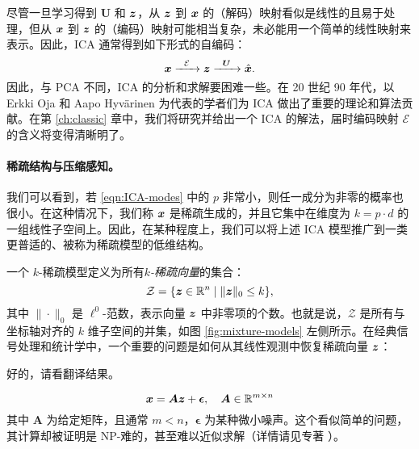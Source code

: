 \documentclass[../../book-main.tex]{subfiles}
\begin{document}
尽管一旦学习得到 $\boldsymbol{U}$ 和 $\bm{z}$，从 $\bm{z}$ 到 $\bm{x}$ 的（解码）映射看似是线性的且易于处理，但从 $\bm{x}$ 到 $\bm{z}$ 的（编码）映射可能相当复杂，未必能用一个简单的线性映射来表示。因此，ICA 通常得到如下形式的自编码：
\begin{equation}
    \bm{x}   \xrightarrow{\hspace{2mm} \mathcal{E}\hspace{2mm}} \bm{z}  \xrightarrow{\hspace{2mm} \boldsymbol{U} \hspace{2mm}} \hat {\bm{x}}.
       \label{eqn:auto-encoding-ICA}
\end{equation}
因此，与 PCA 不同，ICA 的分析和求解要困难一些。在 20 世纪 90 年代，以 Erkki Oja 和 Aapo Hyv\"{a}rinen \cite{hyvarinen-1997,Hyvrinen-2000} 为代表的学者们为 ICA 做出了重要的理论和算法贡献。在第 \ref{ch:classic} 章中，我们将研究并给出一个 ICA 的解法，届时编码映射 $\mathcal{E}$ 的含义将变得清晰明了。



\paragraph{稀疏结构与压缩感知。}
我们可以看到，若 \eqref{eqn:ICA-modes} 中的 $p$ 非常小，则任一成分为非零的概率也很小。在这种情况下，我们称 $\bm{x}$ 是稀疏生成的，并且它集中在维度为 $k = p \cdot d$ 的一组线性子空间上。因此，在某种程度上，我们可以将上述 ICA 模型推广到一类更普适的、被称为稀疏模型的低维结构。

一个 $k$-稀疏模型定义为所有{\em$k$-稀疏向量}的集合：
\begin{equation}
    \mathcal{Z} = \{\bm{z} \in \mathbb{R}^n \mid \|\bm{z}\|_0 \le k\},
\end{equation}
其中 $\| \cdot \|_0$ 是 $\ell^0$-范数，表示向量 $\bm{z}$ 中非零项的个数。也就是说，$\mathcal{Z}$ 是所有与坐标轴对齐的 $k$ 维子空间的并集，如图 \ref{fig:mixture-models} 左侧所示。在经典信号处理和统计学中，一个重要的问题是如何从其线性观测中恢复稀疏向量 $\bm{z}$：

好的，请看翻译结果。

\begin{equation}
    \bm{x} = \boldsymbol{A} \bm{z} + \boldsymbol{\epsilon}, \quad \boldsymbol{A} \in \mathbb{R}^{m\times n}
    \label{eqn:sparse-model}
\end{equation}
其中 $\boldsymbol{A}$ 为给定矩阵，且通常 $m < n$，$\boldsymbol{\epsilon}$ 为某种微小噪声。这个看似简单的问题，其计算却被证明是 NP-难的，甚至难以近似求解（详情请见专著 \cite{Wright-Ma-2022}）。
\end{document}
